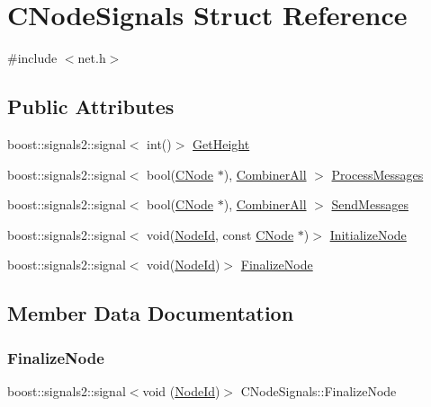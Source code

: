 \hypertarget{struct_c_node_signals}{}\section{C\+Node\+Signals Struct Reference}
\label{struct_c_node_signals}


{\ttfamily \#include $<$net.\+h$>$}

\subsection*{Public Attributes}
\begin{DoxyCompactItemize}
\item 
boost\+::signals2\+::signal$<$ int()$>$ \mbox{\hyperlink{struct_c_node_signals_aa9f8b7c213d6c40be77242e8cbcf46e9}{Get\+Height}}
\item 
boost\+::signals2\+::signal$<$ bool(\mbox{\hyperlink{class_c_node}{C\+Node}} $\ast$), \mbox{\hyperlink{struct_combiner_all}{Combiner\+All}} $>$ \mbox{\hyperlink{struct_c_node_signals_add09b68af12ffb51821a3b8b3d6a197a}{Process\+Messages}}
\item 
boost\+::signals2\+::signal$<$ bool(\mbox{\hyperlink{class_c_node}{C\+Node}} $\ast$), \mbox{\hyperlink{struct_combiner_all}{Combiner\+All}} $>$ \mbox{\hyperlink{struct_c_node_signals_a1799e65509fde2afb090d00ee6f1ab3b}{Send\+Messages}}
\item 
boost\+::signals2\+::signal$<$ void(\mbox{\hyperlink{net_8h_a954d746a58632565552615fd0a4ee660}{Node\+Id}}, const \mbox{\hyperlink{class_c_node}{C\+Node}} $\ast$)$>$ \mbox{\hyperlink{struct_c_node_signals_a137e1854c9fea8a56e5f30be76da8b86}{Initialize\+Node}}
\item 
boost\+::signals2\+::signal$<$ void(\mbox{\hyperlink{net_8h_a954d746a58632565552615fd0a4ee660}{Node\+Id}})$>$ \mbox{\hyperlink{struct_c_node_signals_a4fb2ed0335cbfa8daf5f43a0b42ec481}{Finalize\+Node}}
\end{DoxyCompactItemize}


\subsection{Member Data Documentation}
\mbox{\label{struct_c_node_signals_a4fb2ed0335cbfa8daf5f43a0b42ec481}} 
\subsubsection{\texorpdfstring{Finalize\+Node}{FinalizeNode}}
{\footnotesize\ttfamily boost\+::signals2\+::signal$<$void (\mbox{\hyperlink{net_8h_a954d746a58632565552615fd0a4ee660}{Node\+Id}})$>$ C\+Node\+Signals\+::\+Finalize\+Node}

